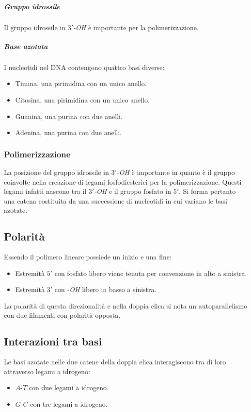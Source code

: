 				\subparagraph{Gruppo idrossile}
				Il gruppo idrossile in \emph{$3'$-OH} \`e importante per la polimerizzazione.
				
				\subparagraph{Base azotata}
				I nucleotidi nel DNA contengono quattro basi diverse:
				\begin{multicols}{2}
					\begin{itemize}
						\item Timina, una pirimidina con un unico anello.
						\item Citosina, una pirimidina con un unico anello.
						\item Guanina, una purina con due anelli.
						\item Adenina, una purina con due anelli.
					\end{itemize}
				\end{multicols}

		\subsubsection{Polimerizzazione}
		La posizione del gruppo idrossile in \emph{$3'$-OH} \`e importante in quanto \`e il gruppo coinvolte nella creazione di legami fosfodiesterici per la polimerizzazione.
		Questi legami infatti nascono tra il \emph{$3'$-OH} e il gruppo fosfato in $5'$.
		Si forma pertanto una catena costituita da una successione di nucleotidi in cui variano le basi azotate.
		
	\subsection{Polarit\`a}
	Essendo il polimero lineare possiede un inizio e una fine:
	\begin{multicols}{2}
		\begin{itemize}
			\item Estremit\`a $5'$ con fosfato libero viene tenuta per convenzione in alto a sinistra.
			\item Estremit\`a $3'$ con \emph{-OH} libero in basso a sinistra.
		\end{itemize}
	\end{multicols}
	La polarit\`a di questa direzionalit\`a e nella doppia elica si nota un autoparallelismo con due filamenti con polarit\`a opposta.

	\subsection{Interazioni tra basi}
	Le basi azotate nelle due catene della doppia elica interagiscono tra di loro attraverso legami a idrogeno:
	\begin{multicols}{2}
		\begin{itemize}
			\item $A$-$T$ con due legami a idrogeno.
			\item $G$-$C$ con tre legami a idrogeno.
		\end{itemize}
	\end{multicols}


